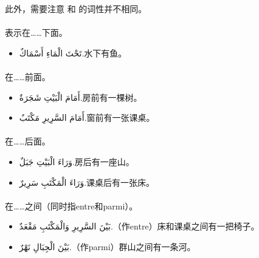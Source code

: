 \begin{attention}
    此外，需要注意  和  的词性并不相同。
\end{attention}
    
\paragraph{} 表示在……下面。
\begin{itemize}
    \item \ac{تَحْتَ الْمَاءِ أَسْمَاكٌ.}{水下有鱼。}
\end{itemize}

\paragraph{} 在……前面。
\begin{itemize}
    \item \ac{أَمَامَ الْبَيْتِ شَجَرَةٌ.}{房前有一棵树。}
    \item \ac{أَمَامَ السَّرِيرِ مَكْتَبٌ.}{窗前有一张课桌。}
\end{itemize}

\paragraph{} 在……后面。
\begin{itemize}
    \item \ac{وَرَاءَ الْبَيْتِ جَبَلٌ.}{房后有一座山。}
    \item \ac{وَرَاءَ الْمَكْتَبِ سَرِيرٌ.}{课桌后有一张床。}
\end{itemize}   

\paragraph{} 在……之间（同时指entre和parmi）。
\begin{itemize}
    \item \ac{بَيْنَ السَّرِيرِ وَالْمَكْتَبِ مَقْعَدٌ.}{（作entre）床和课桌之间有一把椅子。}
    \item \ac{بَيْنَ الْجِبَالِ نَهْرٌ.}{（作parmi）群山之间有一条河。}
\end{itemize}

\begin{note}
    \begin{center}
        
    \end{center}
\end{note}